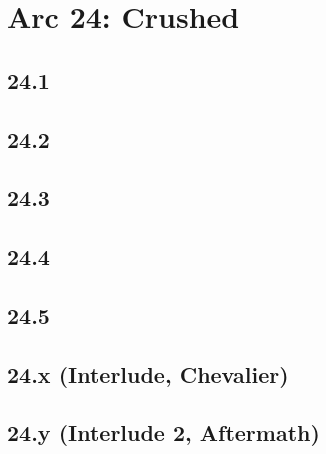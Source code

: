 \part*{Arc 24: Crushed}
 \chapter*{24.1}
 \chapter*{24.2}
 \chapter*{24.3}
 \chapter*{24.4}
 \chapter*{24.5}
 \chapter*{24.x (Interlude, Chevalier)}
 \chapter*{24.y (Interlude 2, Aftermath)}








